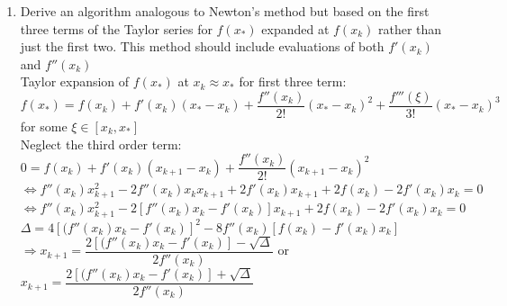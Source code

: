 \documentclass[14pt,a4paper]{article}
\begin{document}
\begin{enumerate}
	\label{4a}
	\item Derive an algorithm analogous to Newton's method but based on the first three terms of the Taylor series for $f(x_*)$ expanded at $f(x_k)$ rather than just the first two. This method should include evaluations of both $f'(x_k)$ and $f''(x_k)$\\ 
	Taylor expansion of $f(x_*)$ at $x_k \approx x_*$ for first three term:\\
	$f(x_*) = f(x_k) + f'(x_k)(x_* - x_k) + \dfrac{f''(x_k)}{2!}(x_* - x_k)^2 + \dfrac{f'''(\xi)}{3!}(x_*-x_k)^3$ for some $\xi \in [x_k,x_*]$ \\
	Neglect the third order term:\\
	\hspace*{2cm}	$ 0 = f(x_k) + f'(x_k)(x_{k+1}-x_k) + \dfrac{f''(x_k)}{2!}(x_{k+1} - x_k)^2$\\
	\hspace*{1.4cm} $ \Leftrightarrow f''(x_k)x_{k+1}^2 - 2f''(x_k)x_kx_{k+1} + 2f'(x_k)x_{k+1} + 2f(x_k) - 2f'(x_k)x_k = 0$\\
	\hspace*{1.4cm} $ \Leftrightarrow f''(x_k)x_{k+1}^2 - 2\left[f''(x_k)x_k - f'(x_k)\right]x_{k+1} + 2f(x_k) - 2f'(x_k)x_k = 0$\\
	\hspace*{3cm} $\Delta = 4 \left[(f''(x_k)x_k - f'(x_k)\right]^2 - 8f''(x_k)\left[f(x_k) - f'(x_k)x_k\right]$\\
	\hspace*{1cm} $\Rightarrow x_{k+1} = \dfrac{2\left[(f''(x_k)x_k - f'(x_k)\right] - \sqrt{\Delta}}{2f''(x_k)}$ \hspace{1cm} or \hspace{0.5cm} $x_{k+1} = \dfrac{2\left[(f''(x_k)x_k - f'(x_k)\right] + \sqrt{\Delta}}{2f''(x_k)}$\\
	

\end{enumerate}
\end{document}
